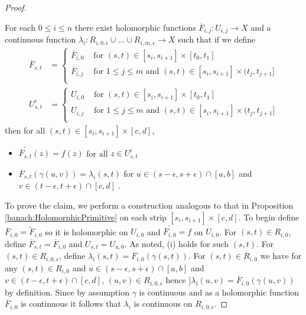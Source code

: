 \begin{proof}
  \begin{clm}For each $0 \leq i \leq n$ there exist holomorphic functions $\overline{F}_{i,j} : U_{i,j} \to X$ and a continuous function $\lambda_i : R_{i,0,\epsilon} \cup \dotsc \cup R_{i,m,\epsilon} \to X$ such that if we define
    \begin{align*}
      \overline{F}_{s,t} &= \begin{cases}
        \overline{F}_{i,0} & \text{ for  $(s,t) \in [s_i, s_{i+1}] \times [t_0, t_1]$} \\
        \overline{F}_{i,j} & \text{ for $1 \leq j \leq m$ and  $(s,t) \in [s_i, s_{i+1}] \times (t_j, t_{j+1}]$} \\
        \end{cases} \\
      U^i_{s,t} &= \begin{cases}
        U_{i,0} & \text{ for  $(s,t) \in [s_i, s_{i+1}] \times [t_0, t_1]$} \\
        U_{i,j} & \text{ for $1 \leq j \leq m$ and  $(s,t) \in [s_i, s_{i+1}] \times (t_j, t_{j+1}]$} \\
      \end{cases}
    \end{align*}
then for all $(s,t) \in [s_i, s_{i+1}] \times [c,d]$,     
  \begin{itemize}
  \item[(i)] $\overline{F}_{s,t}^{\prime}(z) = f(z)$ for all  $z \in U^i_{s,t}$
  \item[(ii)] $\overline{F}_{s,t}(\gamma(u,v)) = \lambda_i(s,t)$ for $u \in (s - \epsilon, s + \epsilon) \cap [a,b]$ and $v \in (t - \epsilon, t + \epsilon) \cap [c,d]$ .
  \end{itemize}
 \end{clm}
  To prove the claim, we perform a construction analogous to that in Proposition \ref{banach:HolomorphicPrimitive} on each strip $[s_i, s_{i+1}] \times [c,d]$.   To begin define $\overline{F}_{i,0} = \tilde{F}_{i,0}$ so it is holomorphic on $U_{i,0}$ and $\overline{F}^\prime_{i,0} = f$ on $U_{i,0}$.   For $(s,t) \in R_{i,0}$, define $\overline{F}_{s,t} = \overline{F}_{i,0}$ and $U_{s,t} = U_{u,0}$.   As noted, (i) holds for such $(s,t)$.  For $(s,t) \in R_{i, 0, \epsilon}$, define $\lambda_i(s,t) = F_{i,0}(\gamma(s,t))$.   For $(s,t) \in R_{i,0}$ we have for any $(s,t) \in R_{i,0}$ and $u \in (s - \epsilon, s + \epsilon) \cap [a,b]$ and $v \in (t - \epsilon, t + \epsilon) \cap [c,d]$, $(u,v) \in R_{i,0, \epsilon}$ hence $]\lambda_i(u,v) = \overline{F}_{i,0}(\gamma(u,v))$ by definition.   Since by assumption $\gamma$ is continuous and as a holomorphic function $\overline{F}_{i,0}$ is continuous it follows that $\lambda_i$ is continuous on $R_{i,0, \epsilon}$.

\end{proof}
